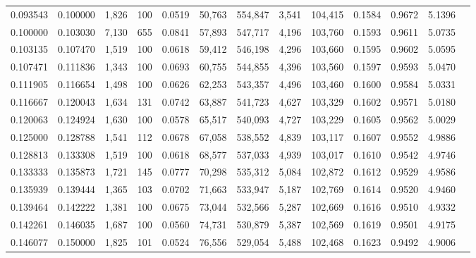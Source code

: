 \begin{tabular}{rrrrrrrrrrrrr}
0.093543 & 0.100000 &  1,826 &   100 &                                     0.0519 &  50,763 & 554,847 &   3,541 & 104,415 & 0.1584 & 0.9672 & 5.1396 \\
0.100000 & 0.103030 &  7,130 &   655 &                                     0.0841 &  57,893 & 547,717 &   4,196 & 103,760 & 0.1593 & 0.9611 & 5.0735 \\
0.103135 & 0.107470 &  1,519 &   100 &                                     0.0618 &  59,412 & 546,198 &   4,296 & 103,660 & 0.1595 & 0.9602 & 5.0595 \\
0.107471 & 0.111836 &  1,343 &   100 &                                     0.0693 &  60,755 & 544,855 &   4,396 & 103,560 & 0.1597 & 0.9593 & 5.0470 \\
0.111905 & 0.116654 &  1,498 &   100 &                                     0.0626 &  62,253 & 543,357 &   4,496 & 103,460 & 0.1600 & 0.9584 & 5.0331 \\
0.116667 & 0.120043 &  1,634 &   131 &                                     0.0742 &  63,887 & 541,723 &   4,627 & 103,329 & 0.1602 & 0.9571 & 5.0180 \\
0.120063 & 0.124924 &  1,630 &   100 &                                     0.0578 &  65,517 & 540,093 &   4,727 & 103,229 & 0.1605 & 0.9562 & 5.0029 \\
0.125000 & 0.128788 &  1,541 &   112 &                                     0.0678 &  67,058 & 538,552 &   4,839 & 103,117 & 0.1607 & 0.9552 & 4.9886 \\
0.128813 & 0.133308 &  1,519 &   100 &                                     0.0618 &  68,577 & 537,033 &   4,939 & 103,017 & 0.1610 & 0.9542 & 4.9746 \\
0.133333 & 0.135873 &  1,721 &   145 &                                     0.0777 &  70,298 & 535,312 &   5,084 & 102,872 & 0.1612 & 0.9529 & 4.9586 \\
0.135939 & 0.139444 &  1,365 &   103 &                                     0.0702 &  71,663 & 533,947 &   5,187 & 102,769 & 0.1614 & 0.9520 & 4.9460 \\
0.139464 & 0.142222 &  1,381 &   100 &                                     0.0675 &  73,044 & 532,566 &   5,287 & 102,669 & 0.1616 & 0.9510 & 4.9332 \\
0.142261 & 0.146035 &  1,687 &   100 &                                     0.0560 &  74,731 & 530,879 &   5,387 & 102,569 & 0.1619 & 0.9501 & 4.9175 \\
0.146077 & 0.150000 &  1,825 &   101 &                                     0.0524 &  76,556 & 529,054 &   5,488 & 102,468 & 0.1623 & 0.9492 & 4.9006 \\

\end{tabular}
